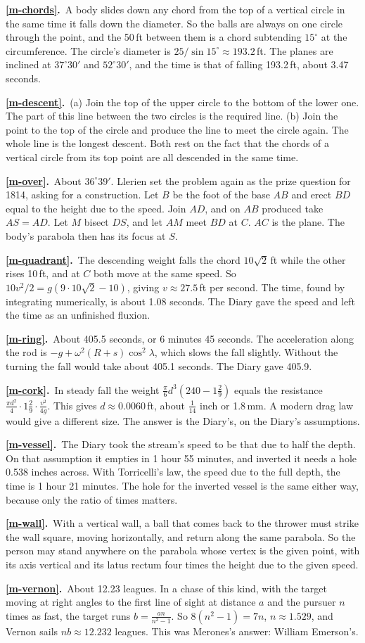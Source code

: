\documentclass[11pt,a4paper]{article}
\newcounter{prob}
\newcommand{\ans}[2]{\par\smallskip\noindent\textbf{\ref{#1}.}\ #2}
\begin{document}
\ans{m-chords}{A body slides down any chord from the top of a vertical circle in the same
time it falls down the diameter. So the balls are always on one circle through the point,
and the 50\,ft between them is a chord subtending $15^\circ$ at the circumference. The
circle's diameter is $25/\sin15^\circ\approx193.2$\,ft. The planes are inclined at
$37^\circ30'$ and $52^\circ30'$, and the time is that of falling 193.2\,ft, about 3.47
seconds.}
\ans{m-descent}{(a) Join the top of the upper circle to the bottom of the lower one. The
part of this line between the two circles is the required line. (b) Join the point to the
top of the circle and produce the line to meet the circle again. The whole line is the
longest descent. Both rest on the fact that the chords of a vertical circle from its top
point are all descended in the same time.}
\ans{m-over}{About $36^\circ39'$. Llerien set the problem again as the prize question for
1814, asking for a construction. Let $B$ be the foot of the base $AB$ and erect $BD$
equal to the height due to the speed. Join $AD$, and on $AB$ produced take $AS = AD$. Let
$M$ bisect $DS$, and let $AM$ meet $BD$ at $C$. $AC$ is the plane. The body's parabola then has its focus at $S$.}
\ans{m-quadrant}{The descending weight falls the chord $10\sqrt2$\,ft while the other rises
10\,ft, and at $C$ both move at the same speed. So $10v^2/2 = g(9\cdot10\sqrt2 - 10)$,
giving $v\approx27.5$\,ft per second. The time, found by integrating numerically, is
about 1.08 seconds. The Diary gave the speed and left the time as an unfinished
fluxion.}
\ans{m-ring}{About 405.5 seconds, or 6 minutes 45 seconds. The acceleration along the rod
is $-g + \omega^2(R+s)\cos^2\lambda$, which slows the fall slightly. Without the turning the
fall would take about 405.1 seconds. The Diary gave 405.9.}
\ans{m-cork}{In steady fall the weight
$\tfrac{\pi}{6}d^3(240 - 1\tfrac29)$ equals the resistance
$\tfrac{\pi d^2}4\cdot1\tfrac29\cdot\tfrac{v^2}{4g}$. This gives $d\approx0.0060$\,ft, about
$\tfrac1{14}$ inch or 1.8\,mm. A modern drag law would give a different size. The
answer is the Diary's, on the Diary's assumptions.}
\ans{m-vessel}{The Diary took the stream's speed to be that due to half the depth. On that
assumption it empties in 1 hour 55 minutes, and inverted it needs a hole 0.538 inches
across. With Torricelli's law, the speed due to the full depth, the time is 1 hour 21
minutes. The hole for the inverted vessel is the same either way, because only the ratio
of times matters.}
\ans{m-wall}{With a vertical wall, a ball that comes back to the thrower must strike the
wall square, moving horizontally, and return along the same parabola. So the person may
stand anywhere on the parabola whose vertex is the given point, with its axis vertical
and its latus rectum four times the height due to the given speed.}
\ans{m-vernon}{About 12.23 leagues. In a chase of this kind, with the target moving at
right angles to the first line of sight at distance $a$ and the pursuer $n$ times as fast,
the target runs $b = \tfrac{an}{n^2-1}$. So $8(n^2-1) = 7n$, $n\approx1.529$, and Vernon
sails $nb\approx12.232$ leagues. This was Merones's answer: William Emerson's.}
\end{document}
